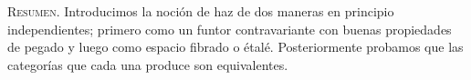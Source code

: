 \textsc{Resumen.} Introducimos la noción de haz de dos maneras en principio independientes; primero como un funtor contravariante con buenas propiedades de pegado y luego como espacio fibrado o étalé. Posteriormente probamos que las categorías que cada una produce son equivalentes.
